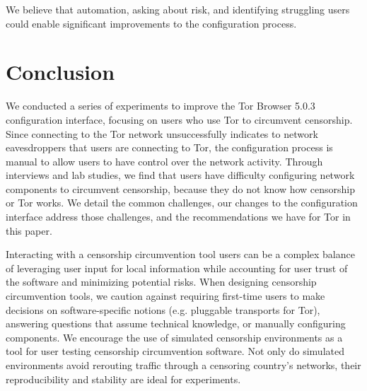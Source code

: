 \documentclass[USenglish,oneside,twocolumn]{article}
\begin{document}
We believe that automation, asking about risk, and identifying struggling users could enable significant improvements to the configuration process. 

\section{Conclusion} 
We conducted a series of experiments to improve the Tor Browser 5.0.3 configuration interface, focusing on users who use Tor to circumvent censorship. Since connecting to the Tor network unsuccessfully indicates to network eavesdroppers that users are connecting to Tor, the configuration process is manual to allow users to have control over the network activity. Through interviews and lab studies, we find that users have difficulty configuring network components to circumvent censorship, because they do not know how censorship or Tor works. We detail the common challenges, our changes to the configuration interface address those challenges, and the recommendations we have for Tor in this paper. 

Interacting with a censorship circumvention tool users can be a complex balance of leveraging user input for local information while accounting for user trust of the software and minimizing potential risks.
When designing censorship circumvention tools, we caution against requiring first-time users to make decisions on software-specific notions (e.g. pluggable transports for Tor), answering questions that assume technical knowledge, or manually configuring components. We encourage the use of simulated censorship environments as a tool for user testing censorship circumvention software. Not only do simulated environments avoid rerouting traffic through a censoring country's networks, their reproducibility and stability are ideal for experiments. 


%
%
\end{document}

